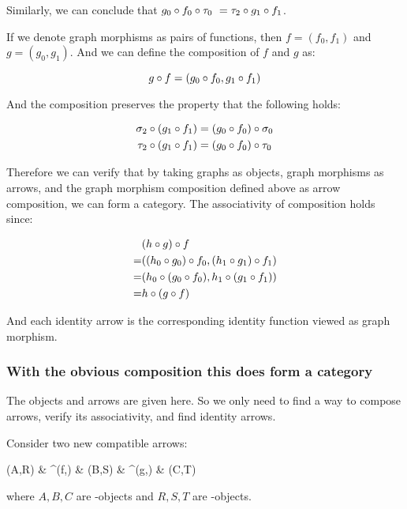 \documentclass[11pt]{article}
\begin{document}
Similarly, we can conclude that $g_0 \circ f_0 \circ \tau_0 \
= \tau_2 \circ g_1 \circ f_1$.

If we denote graph morphisms as pairs of functions, then $f = (f_0,f_1)$ and $g = (g_0,g_1)$.
And we can define the composition of $f$ and $g$ as:

\begin{equation*}
  g \circ f = (g_0 \circ f_0, g_1 \circ f_1)
\end{equation*}

And the composition preserves the property that the following holds:

\begin{align*}
  \sigma_2 \circ (g_1 \circ f_1) & = (g_0 \circ f_0) \circ \sigma_0 \\
  \tau_2 \circ (g_1 \circ f_1) & = (g_0 \circ f_0) \circ \tau_0
\end{align*}

Therefore we can verify that by taking graphs as objects, graph morphisms as arrows,
and the graph morphism composition defined above as arrow composition, we can form a category.
The associativity of composition holds since:

\begin{align*}
  & (h \circ g) \circ f \\
  = & ((h_0 \circ g_0) \circ f_0, (h_1 \circ g_1) \circ f_1) \\
  = & (h_0 \circ (g_0 \circ f_0), h_1 \circ (g_1 \circ f_1)) \\
  = & h \circ (g \circ f)
\end{align*}

And each identity arrow is the corresponding identity function viewed as graph morphism.

\subsubsection{With the obvious composition this does form a category}

The objects and arrows are given here. So we only need to find a way to compose arrows,
verify its associativity, and find identity arrows.

Consider two new compatible arrows:

\begin{diagram}
  (A,R) & \rTo^{(f,\phi)} & (B,S) & \rTo^{(g,\psi)} & (C,T)
\end{diagram}

where $A,B,C$ are -objects and $R,S,T$ are -objects.
\end{document}
